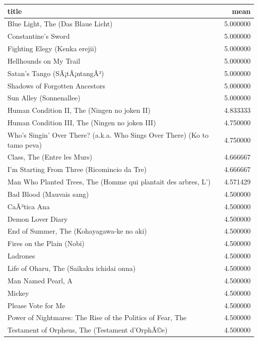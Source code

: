 \documentclass[]{article}
\begin{document}
\begin{table}[H]
\centering\begingroup\fontsize{10}{12}\selectfont

\begin{tabular}{l|r}
\hline
title & mean\\
\hline
Blue Light, The (Das Blaue Licht) & 5.000000\\
\hline
Constantine's Sword & 5.000000\\
\hline
Fighting Elegy (Kenka erejii) & 5.000000\\
\hline
Hellhounds on My Trail & 5.000000\\
\hline
Satan's Tango (SÃ¡tÃ¡ntangÃ³) & 5.000000\\
\hline
Shadows of Forgotten Ancestors & 5.000000\\
\hline
Sun Alley (Sonnenallee) & 5.000000\\
\hline
Human Condition II, The (Ningen no joken II) & 4.833333\\
\hline
Human Condition III, The (Ningen no joken III) & 4.750000\\
\hline
Who's Singin' Over There? (a.k.a. Who Sings Over There) (Ko to tamo peva) & 4.750000\\
\hline
Class, The (Entre les Murs) & 4.666667\\
\hline
I'm Starting From Three (Ricomincio da Tre) & 4.666667\\
\hline
Man Who Planted Trees, The (Homme qui plantait des arbres, L') & 4.571429\\
\hline
Bad Blood (Mauvais sang) & 4.500000\\
\hline
CaÃ³tica Ana & 4.500000\\
\hline
Demon Lover Diary & 4.500000\\
\hline
End of Summer, The (Kohayagawa-ke no aki) & 4.500000\\
\hline
Fires on the Plain (Nobi) & 4.500000\\
\hline
Ladrones & 4.500000\\
\hline
Life of Oharu, The (Saikaku ichidai onna) & 4.500000\\
\hline
Man Named Pearl, A & 4.500000\\
\hline
Mickey & 4.500000\\
\hline
Please Vote for Me & 4.500000\\
\hline
Power of Nightmares: The Rise of the Politics of Fear, The & 4.500000\\
\hline
Testament of Orpheus, The (Testament d'OrphÃ©e) & 4.500000\\
\hline
\end{tabular}
\endgroup{}
\end{table}
\end{document}
